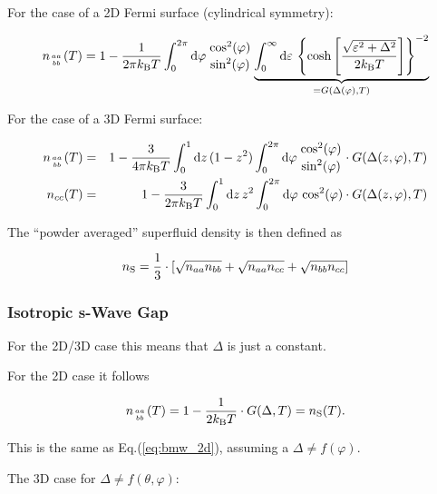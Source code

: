 \documentclass[twoside]{article}
\begin{document}
\noindent For the case of a 2D Fermi surface (cylindrical symmetry):

\begin{equation}\label{eq:n_anisotrope_2D}
n_{aa \atop bb}(T) = 1 - \frac{1}{2\pi k_{\rm B} T} \int_0^{2\pi} \mathrm{d}\varphi\, {\cos^2(\varphi) \atop \sin^2(\varphi)} \underbrace{\int_0^\infty \mathrm{d}\varepsilon\, \left\{ \cosh\left[\frac{\sqrt{\varepsilon^2 + \Delta^2}}{2 k_{\rm B}T}\right]\right\}^{-2}}_{= G(\Delta(\varphi), T)}
\end{equation}

\noindent For the case of a 3D Fermi surface:

\begin{eqnarray}
 n_{aa \atop bb}(T) &=& 1 - \frac{3}{4\pi k_{\rm B} T} \int_0^1 \mathrm{d}z\, (1-z^2) \int_0^{2\pi} \mathrm{d}\varphi\, {\cos^2(\varphi) \atop \sin^2(\varphi)} \cdot G(\Delta(z,\varphi), T) \label{eq:n_anisotrope_3D_aabb} \\
 n_{cc}(T) &=& 1 - \frac{3}{2\pi k_{\rm B} T} \int_0^1 \mathrm{d}z\, z^2 \int_0^{2\pi} \mathrm{d}\varphi\, \cos^2(\varphi) \cdot G(\Delta(z,\varphi), T) \label{eq:n_anisotrope_3D_cc}
\end{eqnarray}

\noindent The ``powder averaged'' superfluid density is then defined as

\begin{equation}\label{eq:n_avg}
 n_{\rm S} = \frac{1}{3}\cdot \left[ \sqrt{n_{aa} n_{bb}} + \sqrt{n_{aa} n_{cc}} + \sqrt{n_{bb} n_{cc}} \right]
\end{equation}

\subsubsection*{Isotropic s-Wave Gap}

\noindent For the 2D/3D case this means that $\Delta$ is just a constant. 

\noindent For the 2D case it follows

\begin{equation}
  n_{aa \atop bb}(T) = 1 - \frac{1}{2 k_{\rm B} T} \cdot G(\Delta, T) = n_{\rm S}(T).
\end{equation}

\noindent This is the same as Eq.(\ref{eq:bmw_2d}), assuming a $\Delta \neq f(\varphi)$.

\vspace{5mm}

\noindent The 3D case for $\Delta \neq f(\theta, \varphi)$:
\end{document}
